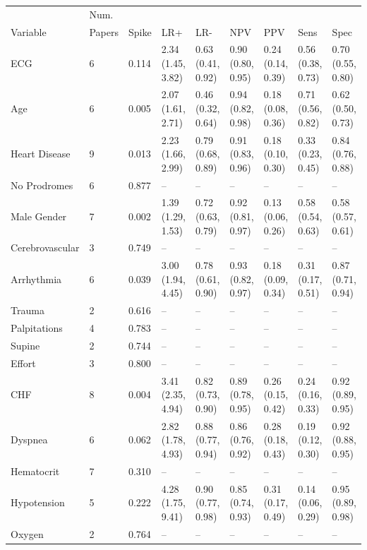 \documentclass[AMA,STIX1COL]{WileyNJD-v2}
\begin{document}
\begin{table}
\centering
\begin{tabular}{lllllllll}
  \hline
             &   Num.      &	&	   &	     &		&	    &		& \\
Variable & Papers & Spike & LR+ & LR- & NPV & PPV & Sens & Spec \\ 
  \hline
ECG & 6 & 0.114 & 2.34 (1.45, 3.82) & 0.63 (0.41, 0.92) & 0.90 (0.80, 0.95) & 0.24 (0.14, 0.39) & 0.56 (0.38, 0.73) & 0.70 (0.55, 0.80) \\ 
  Age & 6 & 0.005 & 2.07 (1.61, 2.71) & 0.46 (0.32, 0.64) & 0.94 (0.82, 0.98) & 0.18 (0.08, 0.36) & 0.71 (0.56, 0.82) & 0.62 (0.50, 0.73) \\ 
  Heart Disease & 9 & 0.013 & 2.23 (1.66, 2.99) & 0.79 (0.68, 0.89) & 0.91 (0.83, 0.96) & 0.18 (0.10, 0.30) & 0.33 (0.23, 0.45) & 0.84 (0.76, 0.88) \\ 
  No Prodromes & 6 & 0.877 & -- & -- & -- & -- & -- & -- \\ 
  Male Gender & 7 & 0.002 & 1.39 (1.29, 1.53) & 0.72 (0.63, 0.79) & 0.92 (0.81, 0.97) & 0.13 (0.06, 0.26) & 0.58 (0.54, 0.63) & 0.58 (0.57, 0.61) \\ 
  Cerebrovascular & 3 & 0.749 & -- & -- & -- & -- & -- & -- \\ 
  Arrhythmia & 6 & 0.039 & 3.00 (1.94, 4.45) & 0.78 (0.61, 0.90) & 0.93 (0.82, 0.97) & 0.18 (0.09, 0.34) & 0.31 (0.17, 0.51) & 0.87 (0.71, 0.94) \\ 
  Trauma & 2 & 0.616 & -- & -- & -- & -- & -- & -- \\ 
  Palpitations & 4 & 0.783 & -- & -- & -- & -- & -- & -- \\ 
  Supine & 2 & 0.744 & -- & -- & -- & -- & -- & -- \\ 
  Effort & 3 & 0.800 & -- & -- & -- & -- & -- & -- \\ 
  CHF & 8 & 0.004 & 3.41 (2.35, 4.94) & 0.82 (0.73, 0.90) & 0.89 (0.78, 0.95) & 0.26 (0.15, 0.42) & 0.24 (0.16, 0.33) & 0.92 (0.89, 0.95) \\ 
  Dyspnea & 6 & 0.062 & 2.82 (1.78, 4.93) & 0.88 (0.77, 0.94) & 0.86 (0.76, 0.92) & 0.28 (0.18, 0.43) & 0.19 (0.12, 0.30) & 0.92 (0.88, 0.95) \\ 
  Hematocrit & 7 & 0.310 & -- & -- & -- & -- & -- & -- \\ 
  Hypotension & 5 & 0.222 & 4.28 (1.75, 9.41) & 0.90 (0.77, 0.98) & 0.85 (0.74, 0.93) & 0.31 (0.17, 0.49) & 0.14 (0.06, 0.29) & 0.95 (0.89, 0.98) \\ 
  Oxygen & 2 & 0.764 & -- & -- & -- & -- & -- & -- \\ 

\end{tabular}
\end{table}
\end{document}
